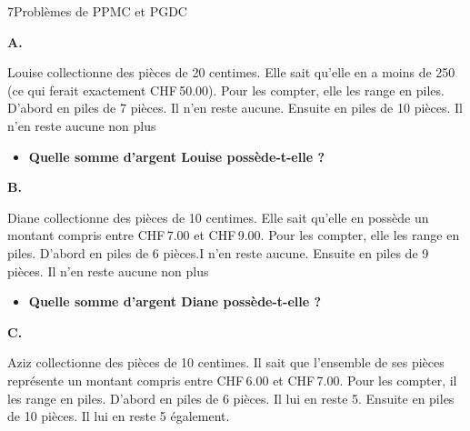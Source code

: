 \begin{exercice}{7}{Problèmes de PPMC et PGDC}

\bigskip\textbf{A.}

\medskip
Louise collectionne des pièces de 20 centimes. Elle sait qu'elle en a moins de 250 (ce qui ferait exactement CHF\,50.00). Pour les compter, elle les range en piles. D'abord en piles de 7 pièces. Il n'en reste aucune. Ensuite en piles de 10 pièces. Il n'en reste aucune non plus

\begin{itemize}[label=$\blacktriangleright$]
\item \textbf{Quelle somme d'argent Louise possède-t-elle ?}
\end{itemize}


\bigskip\textbf{B.}

\medskip
Diane collectionne des pièces de 10 centimes. Elle sait qu'elle en possède un montant compris entre CHF\,7.00 et CHF\,9.00. Pour les compter, elle les range en piles. D'abord en piles de 6 pièces.I n'en reste aucune. Ensuite en piles de 9 pièces. Il n'en reste aucune non plus

\begin{itemize}[label=$\blacktriangleright$]
\item \textbf{Quelle somme d'argent Diane possède-t-elle ?}
\end{itemize}

\bigskip\textbf{C.}

\medskip
Aziz collectionne des pièces de 10 centimes. Il sait que l'ensemble de ses pièces représente un montant compris entre CHF\,6.00 et CHF\,7.00. Pour les compter, il les range en piles. D'abord en piles de 6 pièces. Il lui en reste 5. Ensuite en piles de 10 pièces. Il lui en reste 5 également.


\end{exercice}
